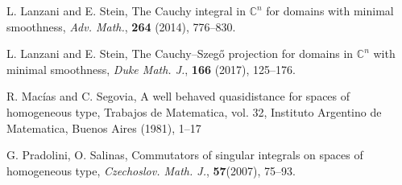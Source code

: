 \documentclass[11pt,a4paper]{amsart}
\numberwithin{equation}{section}
\def\C{\mathbb C}
\begin{document}
{\begin{thebibliography}{10}
 L. Lanzani and E. Stein, The Cauchy integral in $\mathbb C^n$ for domains  with minimal smoothness,
{\it Adv. Math.}, {\bf264} (2014), 776--830.


 L. Lanzani and E. Stein, The Cauchy--Szeg\H o projection for domains in $\mathbb C^n$ with minimal smoothness,
{\it Duke Math. J.}, {\bf166} (2017), 125--176.




%
%
%
%
%
%






R. Mac\'ias and C. Segovia,  A well behaved quasidistance for spaces of homogeneous type, Trabajos de Matematica, vol. 32, Instituto Argentino de Matematica, Buenos Aires (1981), 1--17


%
%
%
%
%


 G. Pradolini, O. Salinas,   Commutators of singular integrals on spaces of homogeneous type, {\it Czechoslov. Math. J.}, {\bf 57}(2007), 75–93.




%
%






\end{thebibliography}}
\end{document}
